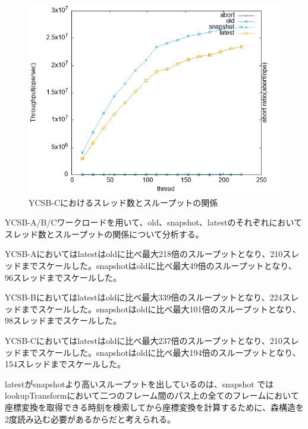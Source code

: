 \documentclass[a4paper]{jreport}	%
\begin{document}
\begin{figure}[h] 
\centering
\includegraphics[width=15cm]{data/stable/ycsb-c/throughput}
\caption{YCSB-Cにおけるスレッド数とスループットの関係}
\label{fig:throughput-c}
\end{figure}


YCSB-A/B/Cワークロードを用いて、old、snapshot、latestのそれぞれにおいてスレッド数とスループットの関係について分析する。


YCSB-Aにおいてはlatestはoldに比べ最大218倍のスループットとなり、210スレッドまでスケールした。snapshotはoldに比べ最大49倍のスループットとなり、96スレッドまでスケールした。

YCSB-Bにおいてはlatestはoldに比べ最大339倍のスループットとなり、224スレッドまでスケールした。snapshotはoldに比べ最大101倍のスループットとなり、98スレッドまでスケールした。

YCSB-Cにおいてはlatestはoldに比べ最大237倍のスループットとなり、210スレッドまでスケールした。snapshotはoldに比べ最大194倍のスループットとなり、154スレッドまでスケールした。

latestがsnapshotより高いスループットを出しているのは、snapshot  ではlookupTransformにおいて二つのフレーム間のパス上の全てのフレームにおいて座標変換を取得できる時刻を検索してから座標変換を計算するために、森構造を2度読み込む必要があるからだと考えられる。


\end{document}

